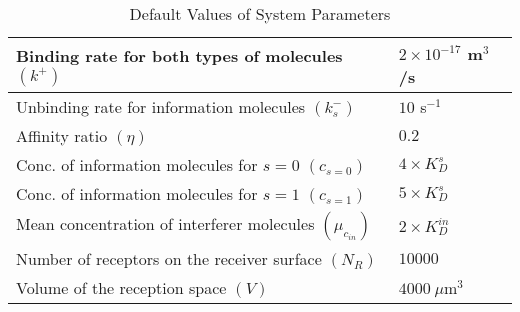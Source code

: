 \documentclass[twocolumn]{IEEEtran}
\newcommand{\p}{\mathrm{p}}
\begin{document}
\begingroup
\begin{table}[!t]
	\centering
	\caption{Default Values of System Parameters}
	\renewcommand{\arraystretch}{1.2} %
	\begin{tabular}{ l | l }
		\hline \hline
		Binding rate for both types of molecules $(k^+)$ & $2 \times 10^{-17}$ m$^3$/s \\ \hline
		Unbinding rate for information molecules $(k^-_s)$ &$  10 $ s$^{-1}$  \\ \hline
		Affinity ratio $(\eta)$ & $ 0.2  $\\ \hline
		Conc. of information molecules for $s = 0$ $(c_{s=0})$ & $4 \times K_D^s$  \\ \hline
		Conc. of information molecules for $s = 1$ $(c_{s=1})$ & $5 \times K_D^s$  \\ \hline
		Mean concentration of interferer molecules $(\mu_{c_{in}})$ & $2 \times K_D^{in}$ \\ \hline
		Number of receptors on the receiver surface $(N_R)$ & $10000$ \\ \hline
		Volume of the reception space $(V)$ & $4000~\mu$m$^3$ \\ \hline
	\end{tabular}
	\label{table:parameters}
\end{table}
\endgroup

\end{document}
